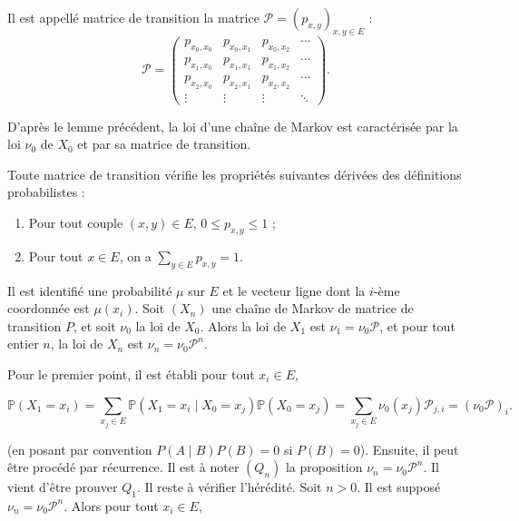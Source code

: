 \begin{sloppypar}
\begin{tcolorbox}[colback=blue!5!white,colframe=blue!75!black,title=Définition]
Il est appellé matrice de transition la matrice $\mathcal{P} = (p_{x,y})_{x,y \in E}$ :
\begin{equation}
\mathcal{P} =
\begin{pmatrix}
p_{x_0,x_0} & p_{x_0,x_1} & p_{x_0,x_2} & \cdots \\
p_{x_1,x_0} & p_{x_1,x_1} & p_{x_1,x_2} & \cdots \\
p_{x_2,x_0} & p_{x_2,x_1} & p_{x_2,x_2} & \cdots \\
\vdots & \vdots & \vdots & \ddots
\end{pmatrix}.   
\end{equation}

D'après le lemme précédent, la loi d'une chaîne de Markov est caractérisée par la loi $\nu_0$ de $X_0$ et par
sa matrice de transition.
\end{tcolorbox}

Toute matrice de transition vérifie les propriétés suivantes dérivées des définitions probabilistes :
\begin{enumerate}
    \item Pour tout couple $(x,y) \in E$, $0 \leq p_{x,y} \leq 1$ ;
    \item Pour tout $x \in E$, on a $\sum_{y \in E} p_{x,y} = 1$.
\end{enumerate}

\begin{tcolorbox}[colback=green!5!white,colframe=green!75!black,title=Proposition]
Il est identifié une probabilité $\mu$ sur $E$ et le vecteur ligne dont la $i$-ème coordonnée est
$\mu(x_i)$. Soit $(X_n)$ une chaîne de Markov de matrice de transition $P$, et soit $\nu_0$ la loi de $X_0$. Alors la loi de
$X_1$ est $\nu_1 = \nu_0 \mathcal{P}$, et pour tout entier $n$, la loi de $X_n$ est $\nu_n = \nu_0 \mathcal{P}^n$.
\end{tcolorbox}

Pour le premier point, il est établi pour tout $x_i \in E$,

\begin{equation}
\mathbb{P}(X_1 = x_i) = \sum_{x_j \in E} \mathbb{P}(X_1 = x_i \mid X_0 = x_j) \mathbb{P}(X_0 = x_j) = \sum_{x_j \in E} \nu_0(x_j) \mathcal{P}_{j,i} = (\nu_0 \mathcal{P})_i.   
\end{equation}

(en posant par convention $P(A \mid B) P(B) = 0$ si $P(B) = 0$). 
Ensuite,  il peut être procédé par récurrence. Il est à noter $(Q_n)$ la proposition $\nu_n = \nu_0 \mathcal{P}^n$. Il vient d'être prouver $Q_1$. Il reste à vérifier l’hérédité. Soit $n > 0$. Il est supposé $\nu_n = \nu_0 \mathcal{P}^n$. Alors pour tout $x_i \in E$,


\end{sloppypar}
